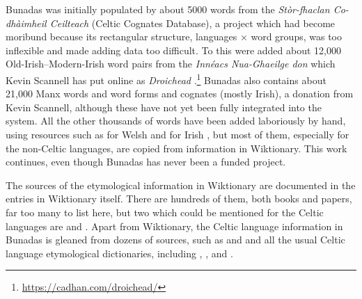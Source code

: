 \documentclass[output=paper,colorlinks,citecolor=brown]{langscibook}
\begin{document}
Bunadas was initially populated by about 5000 words from the \textit{Stòr-fhaclan Co-dhàimheil Ceilteach} (Celtic Cognates Database), a project which had become moribund because its rectangular structure, languages × word groups, was too inflexible and made adding data too difficult. To this were added about 12,000  Old-Irish–Modern-Irish word pairs from the \textit{Innéacs Nua-Ghaeilge don } which Kevin Scannell has put online as \textit{Droichead }.\footnote{ \url{https://cadhan.com/droichead/} } Bunadas also contains about 21,000 Manx words and word forms and cognates (mostly Irish), a donation from Kevin Scannell, although these have not yet been fully integrated into the system. All the other thousands of words have been added laboriously by hand, using resources such as  for Welsh \citep{cod:Thomas2022} and  for Irish \citep{cod:TonerEtAL2019}, but most of them, especially for the non-Celtic languages, are copied from information in Wiktionary. This work continues, even though Bunadas has never been a funded project.



The sources of the etymological information in Wiktionary are documented in the entries in Wiktionary itself. There are hundreds of them, both books and papers, far too many to list here, but two which could be mentioned for the Celtic languages are \citet{cod:Matasovic2009} and \citet{cod:Zair2012}. Apart from Wiktionary, the Celtic language information in Bunadas is gleaned from dozens of sources, such as  and  and all the usual Celtic language etymological dictionaries, including \citet{cod:Deshayes2003}, \citet{cod:Henry1900}, and \citet{cod:MacBain1911}.
\end{document}
